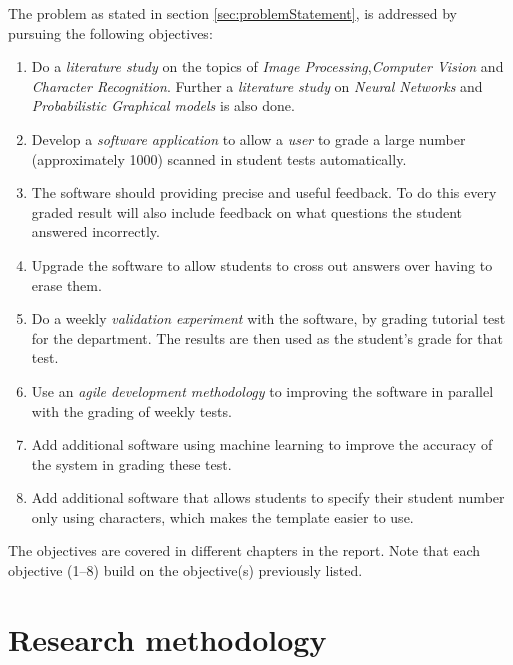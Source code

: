 The problem as stated in section \ref{sec:problemStatement}, is addressed by pursuing the following objectives:
\begin{enumerate}
  \item Do a \textsl{literature study} on the topics of \textsl{Image Processing},\textsl{Computer Vision} and \textsl{Character Recognition}. Further a \textsl{literature study} on \textsl{Neural Networks} and \textsl{Probabilistic Graphical models} is also done.
  \item Develop a \textsl{software application} to allow a \textsl{user} to grade a large number (approximately 1000) scanned in student tests automatically.
\item The software should providing precise and useful feedback. To do this every graded result will also include feedback on what questions the student answered incorrectly.
\item Upgrade the software to allow students to cross out answers over having to erase them.
  \item Do a weekly \textsl{validation experiment} with the software, by grading tutorial test for the department. The results are then used as the student's grade for that test.
  \item Use an \textsl{agile development methodology} to improving the software in parallel with the grading of weekly tests.
  \item Add additional software using machine learning to improve the accuracy of the system in grading these test.
  \item Add additional software that allows students to specify their student number only using characters, which makes the template easier to use.
\end{enumerate}

The objectives are covered in different chapters in the report. Note that each objective (1--8) build on the objective(s) previously listed.


\section{Research methodology}

